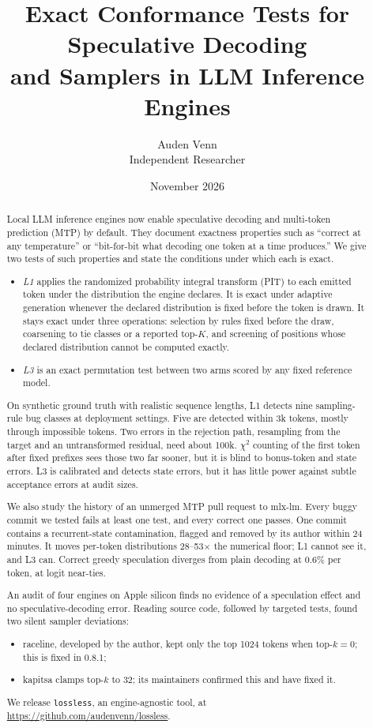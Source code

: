 \documentclass[10pt]{article}
\title{Exact Conformance Tests for Speculative Decoding\\ and Samplers in LLM Inference Engines}
\author{Auden Venn\\ Independent Researcher}
\date{November 2026}
\theoremstyle{remark}
\begin{document}
\maketitle

\begin{abstract}
Local LLM inference engines now enable speculative decoding and multi-token prediction (MTP) by default. They document exactness properties such as ``correct at any temperature'' or ``bit-for-bit what decoding one token at a time produces.'' We give two tests of such properties and state the conditions under which each is exact.
\begin{itemize}
\item \emph{L1} applies the randomized probability integral transform (PIT) to each emitted token under the distribution the engine declares. It is exact under adaptive generation whenever the declared distribution is fixed before the token is drawn. It stays exact under three operations: selection by rules fixed before the draw, coarsening to tie classes or a reported top-$K$, and screening of positions whose declared distribution cannot be computed exactly.
\item \emph{L3} is an exact permutation test between two arms scored by any fixed reference model.
\end{itemize}

On synthetic ground truth with realistic sequence lengths, L1 detects nine sampling-rule bug classes at deployment settings. Five are detected within 3k tokens, mostly through impossible tokens. Two errors in the rejection path, resampling from the target and an untransformed residual, need about 100k. $\chi^2$ counting of the first token after fixed prefixes sees those two far sooner, but it is blind to bonus-token and state errors. L3 is calibrated and detects state errors, but it has little power against subtle acceptance errors at audit sizes.

We also study the history of an unmerged MTP pull request to mlx-lm. Every buggy commit we tested fails at least one test, and every correct one passes. One commit contains a recurrent-state contamination, flagged and removed by its author within 24 minutes. It moves per-token distributions 28--53$\times$ the numerical floor; L1 cannot see it, and L3 can. Correct greedy speculation diverges from plain decoding at 0.6\% per token, at logit near-ties.

An audit of four engines on Apple silicon finds no evidence of a speculation effect and no speculative-decoding error. Reading source code, followed by targeted tests, found two silent sampler deviations:
\begin{itemize}
\item raceline, developed by the author, kept only the top 1024 tokens when top-$k{=}0$; this is fixed in 0.8.1;
\item kapitsa clamps top-$k$ to 32; its maintainers confirmed this and have fixed it.
\end{itemize}
We release \texttt{lossless}, an engine-agnostic tool, at \url{https://github.com/audenvenn/lossless}.
\end{abstract}
\end{document}
